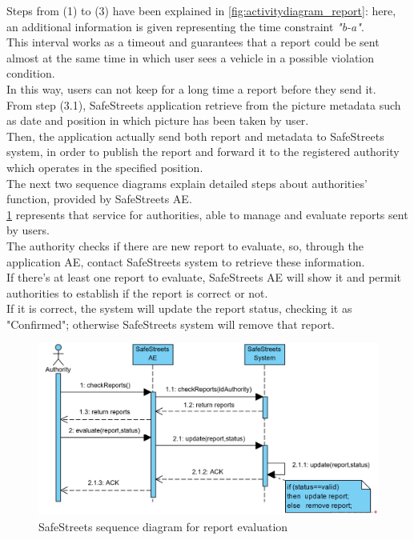 \documentclass{article}
\begin{document}
			Steps from (1) to (3) have been explained in \figurename{ \ref{fig:activitydiagram_report}}: here, an additional information is given representing the time constraint \textit{"b-a"}.\\
			This interval works as a timeout and guarantees that a report could be sent almost at the same time in which user sees a vehicle in a possible violation condition.\\
			In this way, users can not keep for a long time a report before they send it.\\
			From step (3.1), SafeStreets application retrieve from the picture
			 metadata such as date and position in which picture has been taken by user.\\
			 Then, the application actually send both report and metadata to SafeStreets system, in order to publish the report and forward it to the registered authority which operates in the specified position.\\
			 
			 The next two sequence diagrams explain detailed steps about authorities' function, provided by SafeStreets AE.\\
			 \figurename{ \ref{fig:sequencediagram_evaluation}} represents that service for authorities, able to manage and evaluate reports sent by users.\\
			 The authority checks if there are new report to evaluate, so, through the application AE, contact SafeStreets system to retrieve these information.\\
			 If there's at least one report to evaluate, SafeStreets AE will show it and permit authorities to establish if the report is correct or not.\\
			 If it is correct, the system will update the report status, checking it as "Confirmed"; otherwise SafeStreets system will remove that report.\\
			
			\begin{figure}[H]
				\centering
				\includegraphics[width=1\textwidth]{diagrams/sequence_evaluateReport.png}
				\caption[SafeStreets sequence diagram]{SafeStreets sequence diagram for report evaluation}
				\label{fig:sequencediagram_evaluation}
			\end{figure}
		
\end{document}
